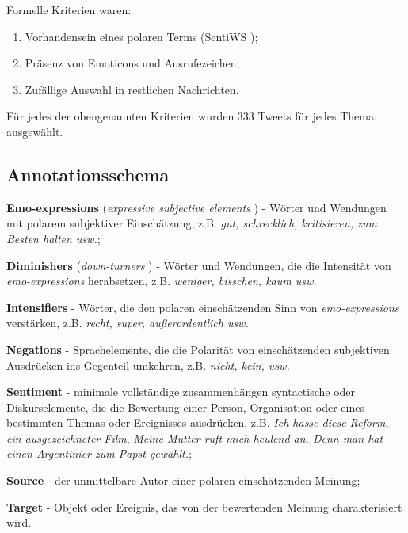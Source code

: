 \documentclass{beamer}
\begin{document}
    \begin{frame}{\insertsubsection}
      Formelle Kriterien waren:
      \begin{enumerate}
      \item Vorhandensein eines polaren Terms (SentiWS \cite{Remus-10});
      \item Pr\"asenz von Emoticons und Ausrufezeichen;
      \item Zuf\"allige Auswahl in restlichen Nachrichten.
      \end{enumerate}
      F\"ur jedes der obengenannten Kriterien wurden 333 Tweets f\"ur jedes
      Thema ausgew\"ahlt.
    \end{frame}

    \subsection{Annotationsschema}
    \begin{frame}{\insertsubsection}
      \textbf{Emo-expressions} (\textit{expressive subjective elements}
      \cite{Wiebe-05}) - W\"orter und Wendungen mit polarem subjektiver
      Einsch\"atzung, z.B. \textit{gut, schrecklich, kritisieren, zum Besten
        halten usw.};

      \textbf{Diminishers} (\textit{down-turners} \cite{Taboada-11}) -
      W\"orter und Wendungen, die die Intensit\"at von
      \textit{emo-expressions} herabsetzen, z.B. \textit{weniger, bisschen,
        kaum usw.}

      \textbf{Intensifiers} - W\"orter, die den polaren einsch\"atzenden Sinn
      von \textit{emo-expressions} verst\"arken, z.B. \textit{recht, super,
        au\ss{}erordentlich usw.}

      \textbf{Negations} - Sprachelemente, die die Polarit\"at von
      einsch\"atzenden subjektiven Ausdr\"ucken ins Gegenteil umkehren,
      z.B. \textit{nicht, kein, usw.}
    \end{frame}

    \begin{frame}{\insertsubsection}
      \textbf{Sentiment} - minimale vollst\"andige zusammenh\"angen
      syntactische oder Diskurselemente, die die Bewertung einer Person,
      Organisation oder eines bestimmten Themas oder Ereignisses ausdr\"ucken,
      z.B. \textit{Ich hasse diese Reform}, \textit{ein ausgezeichneter Film},
      \textit{Meine Mutter ruft mich heulend an.  Denn man hat einen
        Argentinier zum Papst gew\"ahlt.};

      \textbf{Source} - der unmittelbare Autor einer polaren einsch\"atzenden Meinung;

      \textbf{Target} - Objekt oder Ereignis, das von der bewertenden Meinung
      charakterisiert wird.
    \end{frame}
\end{document}
